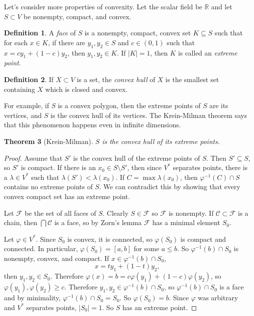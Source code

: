\documentclass[12pt]{report}
\newcommand{\RR}{\mathbb{R}}
\newcommand{\dfn}[1]{\emph{#1}\index{#1}}
\newtheorem{theorem}{Theorem}[chapter]
\theoremstyle{definition}
\newtheorem{definition}[theorem]{Definition}
\begin{document}
    Let's consider more properties of convexity. Let the scalar field be $\RR$ and let $S \subset V$ be nonempty, compact, and convex.
\begin{definition}
    A \dfn{face} of $S$ is a nonempty, compact, convex set $K \subseteq S$ such that for each $x \in K$, if there are $y_1, y_2 \in S$ and $c \in (0, 1)$ such that $x = cy_1 + (1-c)y_2$, then $y_1, y_2 \in K$. If $|K| = 1$, then $K$ is called an \dfn{extreme point}.
\end{definition}
\begin{definition}
    If $X \subset V$ is a set, the \dfn{convex hull} of $X$ is the smallest set containing $X$ which is closed and convex.
\end{definition}
    For example, if $S$ is a convex polygon, then the extreme points of $S$ are its vertices, and $S$ is the convex hull of its vertices. The Krein-Milman theorem says that this phenomenon happens even in infinite dimensions.
\begin{theorem}[Krein-Milman]
    $S$ is the convex hull of its extreme points.
\end{theorem}
\begin{proof}
    Assume that $S'$ is the convex hull of the extreme points of $S$. Then $S' \subseteq S$, so $S'$ is compact. If there is an $x_0 \in S \setminus S'$, then since $V^*$ separates points, there is a $\lambda \in V^*$ such that $\lambda(S') < \lambda(x_0)$. If $C = \max \lambda(x_0)$, then $\varphi^{-1}(C) \cap S$ contains no extreme points of $S$. We can contradict this by showing that every convex compact set has an extreme point.

    Let $\mathcal F$ be the set of all faces of $S$. Clearly $S \in \mathcal F$ so $\mathcal F$ is nonempty. If $\mathcal C \subset \mathcal F$ is a chain, then $\bigcap \mathcal C$ is a face, so by Zorn's lemma $\mathcal F$ has a minimal element $S_0$.
    
    Let $\varphi \in V^*$. Since $S_0$ is convex, it is connected, so $\varphi(S_0)$ is compact and connected. In particular, $\varphi(S_0) = [a, b]$ for some $a \leq b$. So $\varphi^{-1}(b) \cap S_0$ is nonempty, convex, and compact. If $x \in \varphi^{-1}(b) \cap S_0$,
    $$x = ty_1 + (1-t)y_2,$$
    then $y_1,y_2 \in S_0$. Therefore $\varphi(x) = b = c\varphi(y_1) + (1-c)\varphi(y_2)$, so $\varphi(y_1), \varphi(y_2) \geq c$. Therefore $y_1, y_2 \in \varphi^{-1}(b) \cap S_0$, so $\varphi^{-1}(b) \cap S_0$ is a face and by minimality, $\varphi^{-1}(b) \cap S_0 = S_0$. So $\varphi(S_0) = b$. Since $\varphi$ was arbitrary and $V^*$ separates points, $|S_0| = 1$. So $S$ has an extreme point. 
\end{proof}
\end{document}
